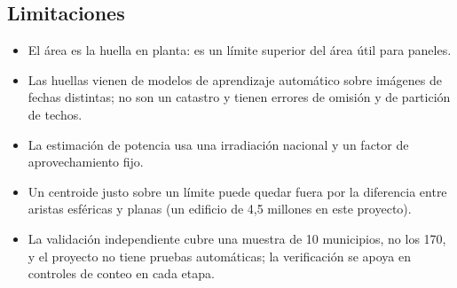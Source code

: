 \subsection{Limitaciones}
\label{sec:limitaciones}

\begin{itemize}
  \item El área es la huella en planta: es un límite superior del área útil
        para paneles.
  \item Las huellas vienen de modelos de aprendizaje automático sobre
        imágenes de fechas distintas; no son un catastro y tienen errores de
        omisión y de partición de techos.
  \item La estimación de potencia usa una irradiación nacional y un factor de
        aprovechamiento fijo.
  \item Un centroide justo sobre un límite puede quedar fuera por la
        diferencia entre aristas esféricas y planas (un edificio de 4,5
        millones en este proyecto).
  \item La validación independiente cubre una muestra de 10 municipios, no
        los 170, y el proyecto no tiene pruebas automáticas; la verificación
        se apoya en controles de conteo en cada etapa.
\end{itemize}
